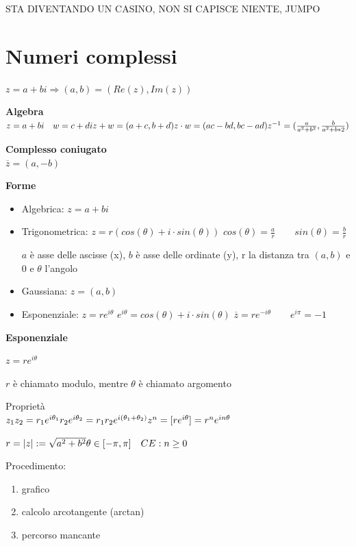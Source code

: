 \documentclass[12pt, a4paper]{article}
\begin{document}
STA DIVENTANDO UN CASINO, NON SI CAPISCE NIENTE, JUMPO

\newpage
\section{Numeri complessi}
$z=a+bi\Rightarrow(a,b)=(Re(z),Im(z))$

\textbf{Algebra}\\$z=a+bi\quad w=c+di\\z+w=(a+c,b+d)\\z\cdot w=(ac-bd,bc-ad)\\z^{-1}=(\frac{a}{a^{2}+b^{2}},
\frac{b}{a^{2}+b*{2}})$

\textbf{Complesso coniugato}\\$\overline{z}=(a,-b)$

\textbf{Forme}
\begin{itemize}
    \item Algebrica: $z=a+bi$
    \item Trigonometrica: $z=r(cos(\theta)+i\cdot sin(\theta))$
    \subitem $cos(\theta)=\frac{a}{r}\qquad sin(\theta)=\frac{b}{r}$
    
    $a$ è asse delle ascisse (x), $b$ è asse delle ordinate (y), r la distanza tra $(a,b)$ e 0 e 
    $\theta$ l'angolo
    
    \item Gaussiana: $z=(a,b)$
    \item Esponenziale: $z=re^{i\theta}$
    \subitem $e^{i\theta}=cos(\theta)+i\cdot sin(\theta)$
    \subitem $\overline{z}=re^{-i\theta}\qquad e^{i\pi}=-1$
\end{itemize}

\textbf{Esponenziale}
\begin{center}
    $z=re^{i\theta}$
\end{center}
$r$ è chiamato modulo, mentre $\theta$ è chiamato argomento

Proprietà\\$z_{1}z_{2}=r_{1}e^{i\theta_{1}}r_{2}e^{i\theta_{2}}=r_{1}r_{2}e^{i(\theta_{1}+\theta_{2})}\\
z^{n}=[re^{i\theta}]=r^{n}e^{in\theta}$

$r=|z|:=\sqrt{a^{2}+b^{2}}\\
\theta\in[-\pi,\pi]\quad CE:n\geq 0$

Procedimento:
\begin{enumerate}
    \item grafico
    \item calcolo arcotangente (arctan)
    \item percorso mancante
\end{enumerate}
\end{document}
